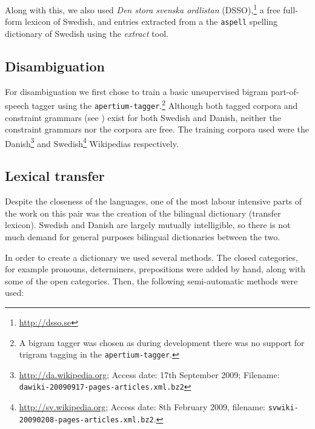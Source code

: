 \documentclass[11pt]{article}
\begin{document}
Along with this, we also used \emph{Den stora svenska ordlistan} (DSSO),\footnote{\url{http://dsso.se}} 
a free full-form lexicon of Swedish, and entries extracted from a the {\tt\small aspell} spelling
dictionary of Swedish using the \emph{extract} tool.

\subsection{Disambiguation}


For disambiguation we first chose to train a basic unsupervised bigram part-of-speech tagger
using the {\tt\small apertium-tagger}.\footnote{A bigram tagger was chosen as during development
there was no support for trigram tagging in the {\tt\small apertium-tagger}.} Although both tagged corpora and constraint
grammars (see \citet{karlsson1995}) exist for both Swedish and Danish, neither the constraint grammars
nor the corpora are free. The training corpora used were the 
Danish\footnote{\url{http://da.wikipedia.org}; Access date: 17th September 2009; 
Filename: {\small\tt dawiki-20090917-pages-articles.xml.bz2}} and Swedish\footnote{\url{http://sv.wikipedia.org}; 
Access date: 8th February 2009, filename: {\small\tt svwiki-20090208-pages-articles.xml.bz2}.} Wikipedias respectively.


\subsection{Lexical transfer}

Despite the closeness of the languages, one of the most labour intensive parts of 
the work on this pair was the creation of the bilingual dictionary (transfer 
lexicon). Swedish and Danish are largely mutually intelligible, so there is not 
much demand for general purposes bilingual dictionaries between the two.

In order to create a dictionary we used several methods. The closed categories, 
for example pronouns, determiners, prepositions were added by hand, along with some 
of the open categories. Then, the following semi-automatic methods were used:
\end{document}
